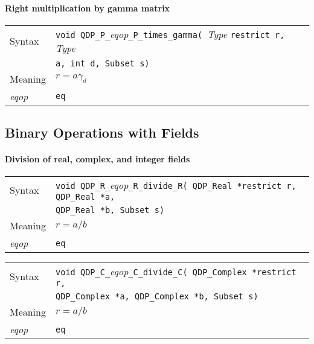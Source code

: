 \documentclass{article}
\newcommand{\tReal}{QDP\ttdash Real }
\newcommand{\tComplex}{QDP\ttdash Complex }
\newcommand{\namespace}{QDP}
\newcommand{\ttdash}{{\tt \_}}
\newcommand{\extraarg}{, Subset s}
\begin{document}
\paragraph{Right multiplication by gamma matrix}
\begin{flushleft}
  \begin{tabular}{|l|l|}
  \hline
  Syntax      & {\tt void \namespace}\ttdash{\tt P}\ttdash{\it eqop}\ttdash{\tt P}\ttdash{\tt times}\ttdash{\tt gamma( }{\it Type }{\tt *restrict r, }{\it Type }\\
              & {\tt *a, int d\extraarg)} \\
  \hline
  Meaning     & $r = a \gamma_d$ \\
  \hline
  {\it eqop}  & {\tt eq} \\
  \hline
  \end{tabular}
\end{flushleft}

\subsection{Binary Operations with Fields}

\paragraph{Division of real, complex, and integer fields}

\begin{flushleft}
  \begin{tabular}{|l|l|}
  \hline
  Syntax      & {\tt void \namespace}\ttdash{\tt R}\ttdash{\it eqop}\ttdash{\tt R}\ttdash{\tt divide}\ttdash{\tt R}{\tt ( \tReal *restrict r, \tReal *a, }\\
              & {\tt \tReal *b\extraarg)} \\
  \hline
  Meaning     & $r = a/b$ \\
  \hline
  {\it eqop}  & {\tt eq} \\
  \hline
  \end{tabular}
\end{flushleft}

\begin{flushleft}
  \begin{tabular}{|l|l|}
  \hline
  Syntax      & {\tt void \namespace}\ttdash{\tt C}\ttdash{\it eqop}\ttdash{\tt C}\ttdash{\tt divide}\ttdash{\tt C}{\tt ( \tComplex *restrict r,}\\
              & {\tt  \tComplex *a, \tComplex *b\extraarg)} \\
  \hline
  Meaning     & $r = a/b$ \\
  \hline
  {\it eqop}  & {\tt eq} \\
  \hline
  \end{tabular}
\end{flushleft}
\end{document}

